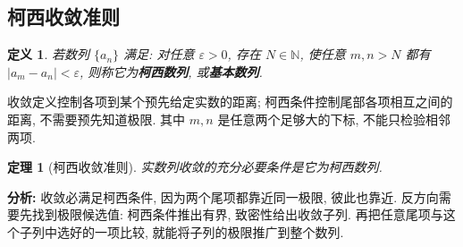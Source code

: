 \documentclass[UTF8,openany]{ctexbook}
\theoremstyle{chinesetextbook}
\newtheorem{definition}{定义}[section]
\newtheorem{theorem}{定理}[section]
\begin{document}
\subsection{柯西收敛准则}
\begin{definition}
若数列 $\{a_n\}$ 满足: 对任意 $\varepsilon>0$, 存在 $N\in\mathbb N$, 使任意 $m,n>N$ 都有 $|a_m-a_n|<\varepsilon$, 则称它为\textbf{柯西数列}, 或\textbf{基本数列}.
\end{definition}
收敛定义控制各项到某个预先给定实数的距离; 柯西条件控制尾部各项相互之间的距离, 不需要预先知道极限. 其中 $m,n$ 是任意两个足够大的下标, 不能只检验相邻两项.
\begin{theorem}[柯西收敛准则]
实数列收敛的充分必要条件是它为柯西数列.
\end{theorem}
\par\indent\textbf{分析:} 收敛必满足柯西条件, 因为两个尾项都靠近同一极限, 彼此也靠近. 反方向需要先找到极限候选值: 柯西条件推出有界, 致密性给出收敛子列. 再把任意尾项与这个子列中选好的一项比较, 就能将子列的极限推广到整个数列.
\end{document}
